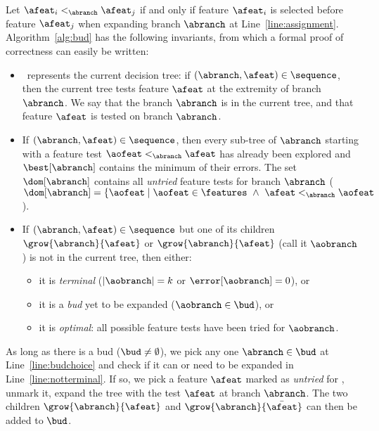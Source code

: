 \documentclass{llncs}
\begin{document}
\medskip

Let $\afeat_i <_{\abranch} \afeat_j$ if and only if feature $\afeat_i$ is selected before feature $\afeat_j$ when expanding branch $\abranch$ at Line~\ref{line:assignment}. Algorithm~\ref{alg:bud} has the following invariants, from which a formal proof of correctness can easily be written:

\begin{itemize}
	\item \sequence\ represents the current decision tree: if $(\abranch,\afeat) \in \sequence$, then the current tree tests feature $\afeat$ at the extremity of branch $\abranch$. We say that the branch $\abranch$ is in the current tree, and that feature $\afeat$ is tested on branch $\abranch$.
	
	\item If $(\abranch,\afeat) \in \sequence$, then every sub-tree of $\abranch$ starting with a feature test $\aofeat <_{\abranch} \afeat$ has already been explored and $\best[\abranch]$ contains the minimum of their errors. The set $\dom[\abranch]$ contains all \emph{untried} feature tests for branch $\abranch$ ($\dom[\abranch] = \{\aofeat \mid \aofeat \in \features ~\wedge~ \afeat <_{\abranch} \aofeat$).
	
	\item If $(\abranch,\afeat) \in \sequence$ but one of its children $\grow{\abranch}{\afeat}$ or $\grow{\abranch}{\afeat}$ (call it $\aobranch$) is not in the current tree, then either:

	\begin{itemize}
		\item it is \emph{terminal} ($|\aobranch|=k$ or $\error[\aobranch]=0$), or
		\item it is a \emph{bud} yet to be expanded ($\aobranch \in \bud$), or
		\item it is \emph{optimal}: all possible feature tests have been tried for $\aobranch$.
	\end{itemize}
\end{itemize}



As long as there is a bud ($\bud \neq \emptyset$), we pick any one $\abranch \in \bud$ at Line~\ref{line:budchoice} and check if it can or need to be expanded in Line~\ref{line:notterminal}. %
If so, we pick a feature $\afeat$ marked as \emph{untried} for \abranch, unmark it, 
expand the tree with the test $\afeat$ at branch $\abranch$. The two children $\grow{\abranch}{\afeat}$ and $\grow{\abranch}{\bar{\afeat}}$ can then be added to $\bud$.
\end{document}
